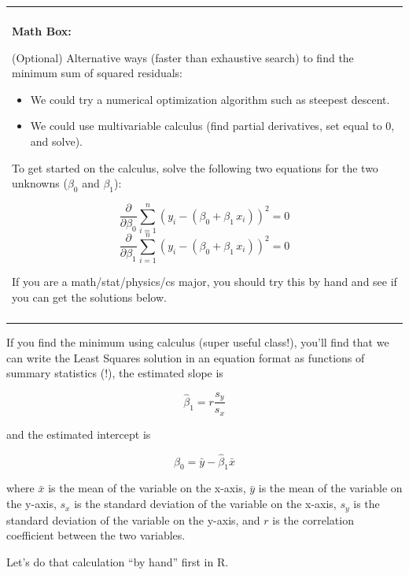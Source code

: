 \documentclass[
]{book}
\newenvironment{Shaded}{\begin{snugshade}}{\end{snugshade}}
\newcommand{\DataTypeTok}[1]{\textcolor[rgb]{0.13,0.29,0.53}{#1}}
\newcommand{\KeywordTok}[1]{\textcolor[rgb]{0.13,0.29,0.53}{\textbf{#1}}}
\newcommand{\NormalTok}[1]{#1}
\newcommand{\OperatorTok}[1]{\textcolor[rgb]{0.81,0.36,0.00}{\textbf{#1}}}
\newcommand{\StringTok}[1]{\textcolor[rgb]{0.31,0.60,0.02}{#1}}
\providecommand{\tightlist}{%
  \setlength{\itemsep}{0pt}\setlength{\parskip}{0pt}}
\newenvironment{mathbox}
{
    \begin{center}
    
    \begin{tabular}{|p{0.8\textwidth}|}
    \rowcolor{LightYellow}
    \hline\\
    \rowcolor{LightYellow}
    \textbf{Math Box:}
}
{
    \\\rowcolor{LightYellow}
    \\\hline
    \end{tabular} 
    \end{center}
}
\begin{document}
\begin{mathbox}
(Optional) Alternative ways (faster than exhaustive search) to find the
minimum sum of squared residuals:

\begin{itemize}
\tightlist
\item
  We could try a numerical optimization algorithm such as steepest
  descent.
\item
  We could use multivariable calculus (find partial derivatives, set
  equal to 0, and solve).
\end{itemize}

To get started on the calculus, solve the following two equations for
the two unknowns (\(\beta_0\) and \(\beta_1\)):

\[\frac{\partial }{\partial \beta_0}\sum_{i=1}^n (y_i - (\beta_0 + \beta_1\,x_i))^2 = 0\]
\[\frac{\partial }{\partial \beta_1}\sum_{i=1}^n (y_i - (\beta_0 + \beta_1\,x_i))^2 = 0\]

If you are a math/stat/physics/cs major, you should try this by hand and
see if you can get the solutions below.
\end{mathbox}

If you find the minimum using calculus (super useful class!), you'll find that we can write the Least Squares solution in an equation format as functions of summary statistics (!), the estimated slope is

\[ \hat{\beta}_1  = r\frac{s_y}{s_x}\]

and the estimated intercept is

\[ \hat{\beta}_0 = \bar{y} - \hat{\beta}_1\bar{x} \]

where \(\bar{x}\) is the mean of the variable on the x-axis, \(\bar{y}\) is the mean of the variable on the y-axis, \(s_x\) is the standard deviation of the variable on the x-axis, \(s_y\) is the standard deviation of the variable on the y-axis, and \(r\) is the correlation coefficient between the two variables.

Let's do that calculation ``by hand'' first in R.

\begin{Shaded}
\end{Shaded}
\end{document}
